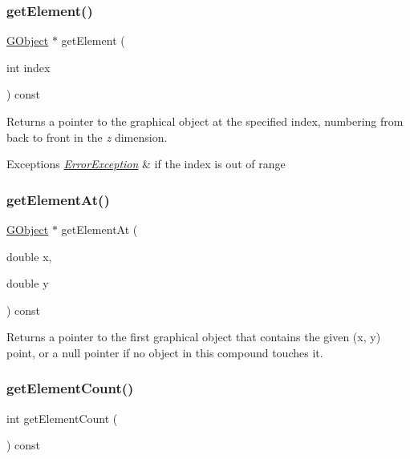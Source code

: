 \subsubsection{\texorpdfstring{get\+Element()}{getElement()}}
{\footnotesize\ttfamily \mbox{\hyperlink{classGObject}{G\+Object}} $\ast$ get\+Element (\begin{DoxyParamCaption}\item[{int}]{index }\end{DoxyParamCaption}) const\hspace{0.3cm}{\ttfamily [virtual]}}



Returns a pointer to the graphical object at the specified index, numbering from back to front in the {\itshape z} dimension. 


\begin{DoxyExceptions}{Exceptions}
{\em \mbox{\hyperlink{classErrorException}{Error\+Exception}}} & if the index is out of range \\
\hline
\end{DoxyExceptions}
\mbox{\label{classGCompound_a25efa999eca5790ec26ef091b05f961c}} 
\subsubsection{\texorpdfstring{get\+Element\+At()}{getElementAt()}}
{\footnotesize\ttfamily \mbox{\hyperlink{classGObject}{G\+Object}} $\ast$ get\+Element\+At (\begin{DoxyParamCaption}\item[{double}]{x,  }\item[{double}]{y }\end{DoxyParamCaption}) const\hspace{0.3cm}{\ttfamily [virtual]}}



Returns a pointer to the first graphical object that contains the given (x, y) point, or a null pointer if no object in this compound touches it. 

\mbox{\label{classGCompound_adf7d37ec315f859648def92e6b32408f}} 
\subsubsection{\texorpdfstring{get\+Element\+Count()}{getElementCount()}}
{\footnotesize\ttfamily int get\+Element\+Count (\begin{DoxyParamCaption}{ }\end{DoxyParamCaption}) const\hspace{0.3cm}{\ttfamily [virtual]}}



